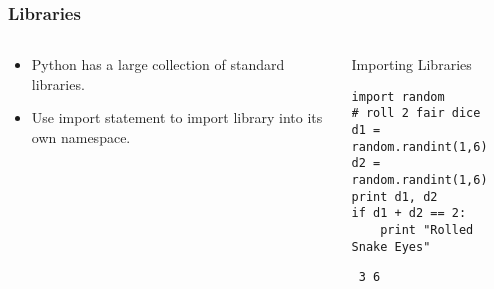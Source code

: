 \documentclass[bigger]{beamer}
\begin{document}
\begin{frame}[fragile]
\frametitle{Libraries}
\label{sec-1-12}
\begin{columns}
\begin{column}{0.4\textwidth}
\label{sec-1-12-1}

\begin{itemize}
\item Python has a large collection of standard libraries.
\item Use import statement to import library into its own namespace.
\end{itemize}
\end{column}
\begin{column}{0.6\textwidth}
\begin{block}{Importing Libraries}
\label{sec-1-12-2}

\fontsize{6}{7.2}\selectfont

\begin{verbatim}
import random
# roll 2 fair dice
d1 = random.randint(1,6)
d2 = random.randint(1,6)
print d1, d2
if d1 + d2 == 2:
    print "Rolled Snake Eyes"
\end{verbatim}

\begin{verbatim}
 3 6
\end{verbatim}
\end{block}
\end{column}
\end{columns}
\end{frame}
\end{document}

